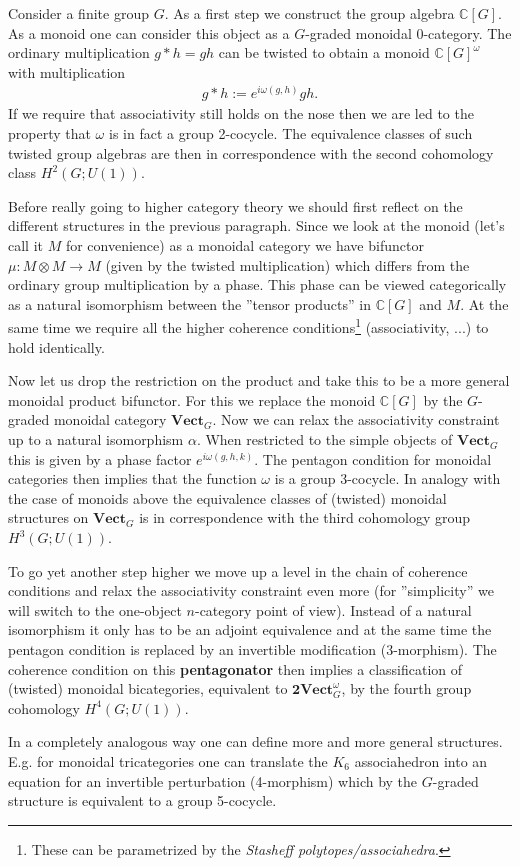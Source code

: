     Consider a finite group $G$. As a first step we construct the group algebra $\mathbb{C}[G]$. As a monoid one can consider this object as a $G$-graded monoidal 0-category. The ordinary multiplication $g\ast h=gh$ can be twisted to obtain a monoid $\mathbb{C}[G]^\omega$ with multiplication
    \begin{gather}
        g\ast h := e^{i\omega(g, h)}gh.
    \end{gather}
    If we require that associativity still holds on the nose then we are led to the property that $\omega$ is in fact a group 2-cocycle. The equivalence classes of such twisted group algebras are then in correspondence with the second cohomology class $H^2(G; U(1))$.

    Before really going to higher category theory we should first reflect on the different structures in the previous paragraph. Since we look at the monoid (let's call it $M$ for convenience) as a monoidal category we have bifunctor $\mu:M\otimes M\rightarrow M$ (given by the twisted multiplication) which differs from the ordinary group multiplication by a phase. This phase can be viewed categorically as a natural isomorphism between the ''tensor products'' in $\mathbb{C}[G]$ and $M$. At the same time we require all the higher coherence conditions\footnote{These can be parametrized by the \textit{Stasheff polytopes/associahedra}.} (associativity, ...) to hold identically.

    Now let us drop the restriction on the product and take this to be a more general monoidal product bifunctor. For this we replace the monoid $\mathbb{C}[G]$ by the $G$-graded monoidal category $\textbf{Vect}_G$. Now we can relax the associativity constraint up to a natural isomorphism $\alpha$. When restricted to the simple objects of $\textbf{Vect}_G$ this is given by a phase factor $e^{i\omega(g, h, k)}$. The pentagon condition for monoidal categories then implies that the function $\omega$ is a group 3-cocycle. In analogy with the case of monoids above the equivalence classes of (twisted) monoidal structures on $\textbf{Vect}_G$ is in correspondence with the third cohomology group $H^3(G; U(1))$.

    To go yet another step higher we move up a level in the chain of coherence conditions and relax the associativity constraint even more (for ''simplicity'' we will switch to the one-object $n$-category point of view). Instead of a natural isomorphism it only has to be an adjoint equivalence and at the same time the pentagon condition is replaced by an invertible modification (3-morphism). The coherence condition on this \textbf{pentagonator} then implies a classification of (twisted) monoidal bicategories, equivalent to $\textbf{2Vect}_G^\omega$, by the fourth group cohomology $H^4(G; U(1))$.

    In a completely analogous way one can define more and more general structures. E.g. for monoidal tricategories one can translate the $K_6$ associahedron into an equation for an invertible perturbation (4-morphism) which by the $G$-graded structure is equivalent to a group 5-cocycle.

